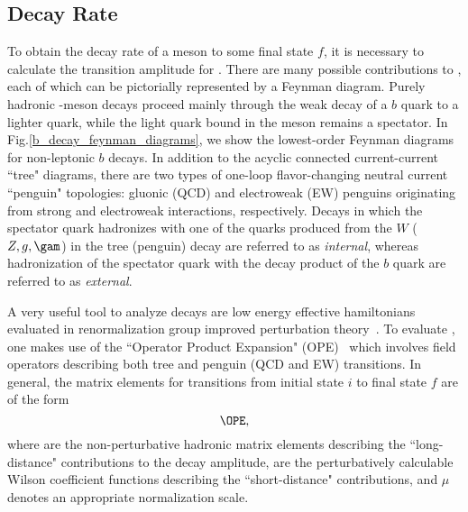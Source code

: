 \subsection{Decay Rate}
To obtain the decay rate of a \B meson to some final state $f$, it is necessary to calculate the transition amplitude \calM for \BtoF. There are many possible contributions to \calM, each of which can be pictorially represented by a Feynman diagram. Purely hadronic \B-meson decays proceed mainly through the weak decay of a $b$ quark to a lighter quark, while the light quark bound in the \B meson remains a spectator. In Fig.\ref{b_decay_feynman_diagrams}, we show the lowest-order Feynman diagrams for non-leptonic $b$ decays. In addition to the acyclic connected current-current ``tree" diagrams, there are two types of one-loop flavor-changing neutral current ``penguin" topologies: gluonic (QCD) and electroweak (EW) penguins originating from strong and electroweak interactions, respectively. Decays in which the spectator quark hadronizes with one of the quarks produced from the $W$ ($Z,g,\gam$) in the tree (penguin) decay are referred to as {\it internal}, whereas hadronization of the spectator quark with the decay product of the $b$ quark are referred to as {\it external}.

A very useful tool to analyze \B decays are low energy effective hamiltonians \Heff evaluated in renormalization group improved perturbation theory~\cite{Fleischer}. To evaluate \Heff, one makes use of the ``Operator Product Expansion" (OPE)~\cite{OPE} which involves field operators \Qk describing both tree and penguin (QCD and EW) transitions. In general, the matrix elements for transitions from initial state $i$ to final state $f$ are of the form
\begin{equation}
\OPE,
\end{equation}
where \HME are the non-perturbative hadronic matrix elements describing the ``long-distance" contributions to the decay amplitude, \Ck are the perturbatively calculable Wilson coefficient functions describing the ``short-distance" contributions, and $\mu$ denotes an appropriate normalization scale. 

